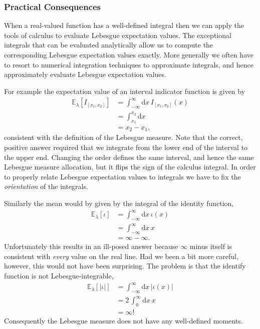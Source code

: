 \documentclass[
  letterpaper,
  DIV=11,
  numbers=noendperiod]{scrartcl}
\begin{document}
\hypertarget{practical-consequences-1}{%
\subsubsection{Practical Consequences}\label{practical-consequences-1}}

When a real-valued function has a well-defined integral then we can
apply the tools of calculus to evaluate Lebesgue expectation values. The
exceptional integrals that can be evaluated analytically allow us to
compute the corresponding Lebesgue expectation values exactly. More
generally we often have to resort to numerical integration techniques to
approximate integrals, and hence approximately evaluate Lebesgue
expectation values.

For example the expectation value of an interval indicator function is
given by \begin{align*}
\mathbb{E}_{\lambda}[I_{[x_{1}, x_{2}]}]
&=
\int_{-\infty}^{\infty} \mathrm{d} x \, I_{[x_{1}, x_{2}]}(x)
\\
&=
\int_{x_{1}}^{x_{2}} \mathrm{d} x
\\
&=
x_{2} - x_{1},
\end{align*} consistent with the definition of the Lebesgue measure.
Note that the correct, positive answer required that we integrate from
the lower end of the interval to the upper end. Changing the order
defines the same interval, and hence the same Lebesgue measure
allocation, but it flips the sign of the calculus integral. In order to
properly relate Lebesgue expectation values to integrals we have to fix
the \emph{orientation} of the integrals.

Similarly the mean would by given by the integral of the identity
function, \begin{align*}
\mathbb{E}_{\lambda}[\iota]
&=
\int_{-\infty}^{\infty} \mathrm{d} x \, \iota(x)
\\
&=
\int_{-\infty}^{\infty} \mathrm{d} x \, x
\\
&=
\infty - \infty.
\end{align*} Unfortunately this results in an ill-posed answer because
\(\infty\) minus itself is consistent with \emph{every} value on the
real line. Had we been a bit more careful, however, this would not have
been surprising. The problem is that the identify function is not
Lebesgue-integrable, \begin{align*}
\mathbb{E}_{\lambda}[| \iota |]
&=
\int_{-\infty}^{\infty} \mathrm{d} x \, | \iota(x) |
\\
&=
2 \, \int_{0}^{\infty} \mathrm{d} x \, x
\\
&=
\infty!
\end{align*} Consequently the Lebesgue measure does not have any
well-defined moments.
\end{document}
